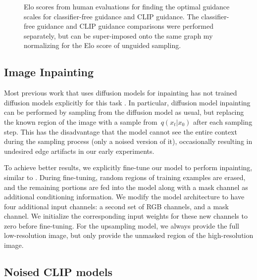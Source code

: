 \documentclass{article}
\begin{document}
\begin{figure}[h!]
    \begin{center}
    \end{center}
    \vskip -0.1in
    \caption{Elo scores from human evaluations for finding the optimal guidance scales for classifier-free guidance and CLIP guidance. The classifier-free guidance and CLIP guidance comparisons were performed separately, but can be super-imposed onto the same graph my normalizing for the Elo score of unguided sampling.}
    \label{fig:humaneval_scale}
    \vskip -0.1in
\end{figure}


\subsection{Image Inpainting}

Most previous work that uses diffusion models for inpainting has not trained diffusion models explicitly for this task \citep{dickstein,sde,sdedit}. In particular, diffusion model inpainting can be performed by sampling from the diffusion model as usual, but replacing the known region of the image with a sample from~$q(x_t|x_0)$ after each sampling step. This has the disadvantage that the model cannot see the entire context during the sampling process (only a noised version of it), occasionally resulting in undesired edge artifacts in our early experiments.

To achieve better results, we explicitly fine-tune our model to perform inpainting, similar to \citet{palette}. During fine-tuning, random regions of training examples are erased, and the remaining portions are fed into the model along with a mask channel as additional conditioning information. We modify the model architecture to have four additional input channels: a second set of RGB channels, and a mask channel. We initialize the corresponding input weights for these new channels to zero before fine-tuning. For the upsampling model, we always provide the full low-resolution image, but only provide the unmasked region of the high-resolution image.


\subsection{Noised CLIP models}
\label{sec:clipguided_diffusion}
\end{document}
